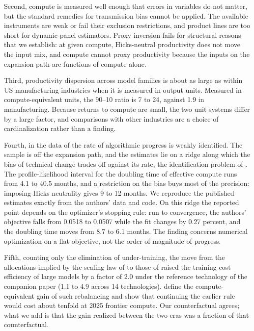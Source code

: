 \documentclass[AER,finalmode]{AEA}
\theoremstyle{definition}
\theoremstyle{remark}
\begin{document}
Second, compute is measured well enough that errors in variables do not matter, but the standard remedies for
transmission bias cannot be applied. The available instruments are weak or fail their exclusion restrictions, and
product lines are too short for dynamic-panel estimators. Proxy inversion fails for structural reasons that we
establish: at given compute, Hicks-neutral productivity does not move the input mix, and compute cannot proxy
productivity because the inputs on the expansion path are functions of compute alone.

Third, productivity dispersion across model families is about as large as within US manufacturing industries when it
is measured in output units. Measured in compute-equivalent units, the 90--10 ratio is 7 to 24, against 1.9 in
manufacturing. Because returns to compute are small, the two unit systems differ by a large factor, and comparisons with
other industries are a choice of cardinalization rather than a finding.

Fourth, in the data of \citet{ho2024algorithmic} the rate of algorithmic progress is weakly identified. The sample is
off the expansion path, and the estimates lie on a ridge along which the bias of technical change trades off against
its rate, the identification problem of \citet{diamond1978measurement}. The profile-likelihood interval for the doubling
time of effective compute runs from 4.1 to 40.5 months, and a restriction on the bias buys most of the precision:
imposing Hicks neutrality gives 9 to 12 months. We reproduce the published estimates exactly from the authors' data and
code. On this ridge the reported point depends on the optimizer's stopping rule: run to convergence, the authors'
objective falls from 0.0518 to 0.0507 while the fit changes by 0.27 percent, and the doubling time moves from 8.7 to
6.1 months. The finding concerns numerical optimization on a flat objective, not the order of magnitude of progress.

Fifth, counting only the elimination of under-training, the move from the allocations implied by the scaling law of
\citet{kaplan2020scaling} to those of \citet{hoffmann2022training} raised the training-cost efficiency of large models
by a factor of 2.0 under the reference technology of the companion paper (1.1 to 4.9 across 14 technologies).
\citet{gundlach2025origin} define the compute-equivalent gain of such rebalancing and show that continuing the earlier
rule would cost about tenfold at 2025 frontier compute. Our counterfactual agrees; what we add is that the gain
realized between the two eras was a fraction of that counterfactual.
\end{document}
